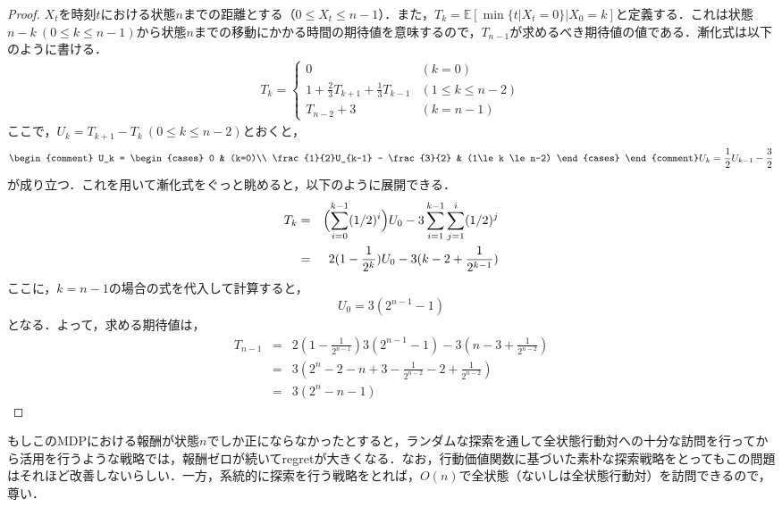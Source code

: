 \documentclass{jsarticle}
\begin{document}
\begin{proof}
$X_t$を時刻$t$における状態$n$までの距離とする（$0 \le X_t \le n-1$）．また，$T_{k} = \mathbb{E}[\min\{ t | X_t = 0 \} | X_0 = k]$と定義する．これは状態$n-k \ (0\le k \le n-1)$から状態$n$までの移動にかかる時間の期待値を意味するので，$T_{n-1}$が求めるべき期待値の値である．漸化式は以下のように書ける．
\begin{eqnarray*}
T_{k} = \begin{cases}
    0 & (k=0) \\
    1 + \frac{2}{3}T_{k+1} + \frac{1}{3}T_{k-1} & (1\le k \le n-2) \\
    T_{n-2} + 3 & (k = n-1)
  \end{cases}
\end{eqnarray*}
ここで，$U_k = T_{k+1} - T_{k}\  (0\le k \le n-2)$とおくと，
\begin{eqnarray*}
\begin{comment}
U_k = \begin{cases}
0 & (k=0)\\
\frac{1}{2}U_{k-1} - \frac{3}{2} & (1\le k \le n-2)
\end{cases}
\end{comment}
U_k = \frac{1}{2}U_{k-1} - \frac{3}{2}
\end{eqnarray*}
が成り立つ．これを用いて漸化式をぐっと眺めると，以下のように展開できる．
\begin{eqnarray*}
T_k &=& \Bigl(\sum_{i=0}^{k-1}(1/2)^i\Bigr)U_0 - 3 \sum_{i=1}^{k-1}\sum_{j=1}^i (1/2)^j\\
&=& 2(1-\frac{1}{2^k})U_0 - 3(k-2+\frac{1}{2^{k-1}})
\end{eqnarray*}
ここに，$k=n-1$の場合の式を代入して計算すると，
\[U_0 = 3(2^{n-1}-1)
\]
となる．よって，求める期待値は，
\begin{eqnarray*}
T_{n-1} &=& 2(1-\frac{1}{2^{n-1}})  3(2^{n-1}-1) - 3(n-3+\frac{1}{2^{n-2}})
\\
&=& 3(2^n-2-n+3-\frac{1}{2^{n-2}}-2+\frac{1}{2^{n-2}})\\
&=& 3(2^n-n-1)
\end{eqnarray*}
\end{proof}
もしこのMDPにおける報酬が状態$n$でしか正にならなかったとすると，ランダムな探索を通して全状態行動対への十分な訪問を行ってから活用を行うような戦略では，報酬ゼロが続いてregretが大きくなる．なお，行動価値関数に基づいた素朴な探索戦略をとってもこの問題はそれほど改善しないらしい．一方，系統的に探索を行う戦略をとれば，$O(n)$で全状態（ないしは全状態行動対）を訪問できるので，尊い．
\end{document}
